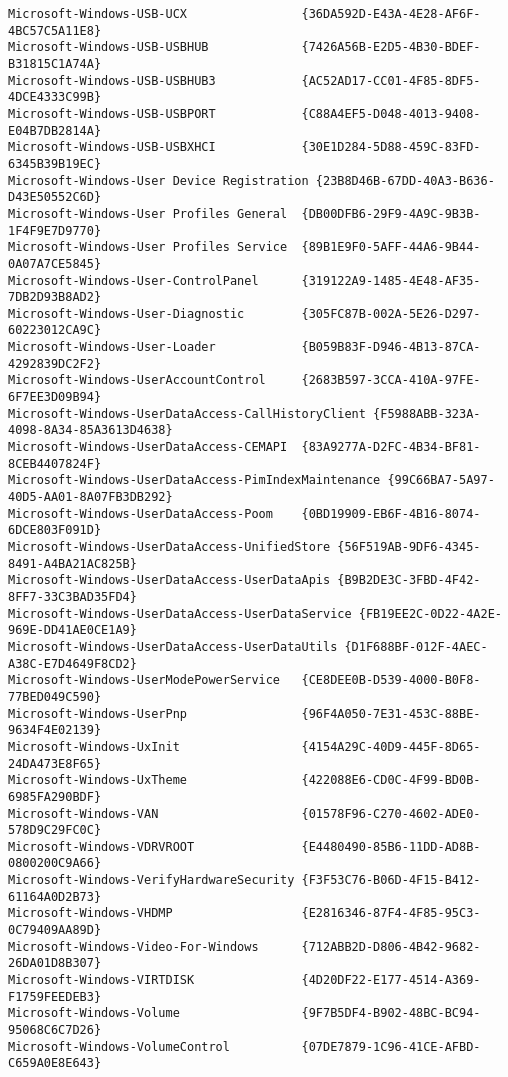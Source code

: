 \documentclass{report}
\begin{document}
\begin{lstlisting}[breaklines=true,basicstyle=\tiny]
Microsoft-Windows-USB-UCX                {36DA592D-E43A-4E28-AF6F-4BC57C5A11E8}
Microsoft-Windows-USB-USBHUB             {7426A56B-E2D5-4B30-BDEF-B31815C1A74A}
Microsoft-Windows-USB-USBHUB3            {AC52AD17-CC01-4F85-8DF5-4DCE4333C99B}
Microsoft-Windows-USB-USBPORT            {C88A4EF5-D048-4013-9408-E04B7DB2814A}
Microsoft-Windows-USB-USBXHCI            {30E1D284-5D88-459C-83FD-6345B39B19EC}
Microsoft-Windows-User Device Registration {23B8D46B-67DD-40A3-B636-D43E50552C6D}
Microsoft-Windows-User Profiles General  {DB00DFB6-29F9-4A9C-9B3B-1F4F9E7D9770}
Microsoft-Windows-User Profiles Service  {89B1E9F0-5AFF-44A6-9B44-0A07A7CE5845}
Microsoft-Windows-User-ControlPanel      {319122A9-1485-4E48-AF35-7DB2D93B8AD2}
Microsoft-Windows-User-Diagnostic        {305FC87B-002A-5E26-D297-60223012CA9C}
Microsoft-Windows-User-Loader            {B059B83F-D946-4B13-87CA-4292839DC2F2}
Microsoft-Windows-UserAccountControl     {2683B597-3CCA-410A-97FE-6F7EE3D09B94}
Microsoft-Windows-UserDataAccess-CallHistoryClient {F5988ABB-323A-4098-8A34-85A3613D4638}
Microsoft-Windows-UserDataAccess-CEMAPI  {83A9277A-D2FC-4B34-BF81-8CEB4407824F}
Microsoft-Windows-UserDataAccess-PimIndexMaintenance {99C66BA7-5A97-40D5-AA01-8A07FB3DB292}
Microsoft-Windows-UserDataAccess-Poom    {0BD19909-EB6F-4B16-8074-6DCE803F091D}
Microsoft-Windows-UserDataAccess-UnifiedStore {56F519AB-9DF6-4345-8491-A4BA21AC825B}
Microsoft-Windows-UserDataAccess-UserDataApis {B9B2DE3C-3FBD-4F42-8FF7-33C3BAD35FD4}
Microsoft-Windows-UserDataAccess-UserDataService {FB19EE2C-0D22-4A2E-969E-DD41AE0CE1A9}
Microsoft-Windows-UserDataAccess-UserDataUtils {D1F688BF-012F-4AEC-A38C-E7D4649F8CD2}
Microsoft-Windows-UserModePowerService   {CE8DEE0B-D539-4000-B0F8-77BED049C590}
Microsoft-Windows-UserPnp                {96F4A050-7E31-453C-88BE-9634F4E02139}
Microsoft-Windows-UxInit                 {4154A29C-40D9-445F-8D65-24DA473E8F65}
Microsoft-Windows-UxTheme                {422088E6-CD0C-4F99-BD0B-6985FA290BDF}
Microsoft-Windows-VAN                    {01578F96-C270-4602-ADE0-578D9C29FC0C}
Microsoft-Windows-VDRVROOT               {E4480490-85B6-11DD-AD8B-0800200C9A66}
Microsoft-Windows-VerifyHardwareSecurity {F3F53C76-B06D-4F15-B412-61164A0D2B73}
Microsoft-Windows-VHDMP                  {E2816346-87F4-4F85-95C3-0C79409AA89D}
Microsoft-Windows-Video-For-Windows      {712ABB2D-D806-4B42-9682-26DA01D8B307}
Microsoft-Windows-VIRTDISK               {4D20DF22-E177-4514-A369-F1759FEEDEB3}
Microsoft-Windows-Volume                 {9F7B5DF4-B902-48BC-BC94-95068C6C7D26}
Microsoft-Windows-VolumeControl          {07DE7879-1C96-41CE-AFBD-C659A0E8E643}

\end{lstlisting}
\end{document}

